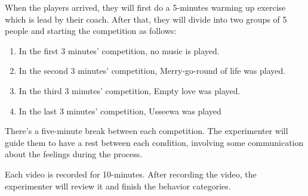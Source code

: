 \documentclass[man,floatsintext]{apa7}
\begin{document}
When the players arrived, they will first do a 5-minutes warming up exercise which is lead by their coach. After that, they will divide into two groups of 5 people and starting the competition as follows:

\begin{enumerate}
    \item In the first 3 minutes' competition, no music is played. 
    \item In the second 3 minutes' competition, Merry-go-round of life was played.
    \item In the third 3 minutes' competition, Empty love was played.
    \item In the last 3 minutes' competition, Usseewa was played
\end{enumerate}

There's a five-minute break between each competition. The experimenter will guide them to have a rest between each condition, involving some communication about the feelings during the process.

Each video is recorded for 10-minutes. After recording the video, the experimenter will review it and finish the behavior categories.
\end{document}
